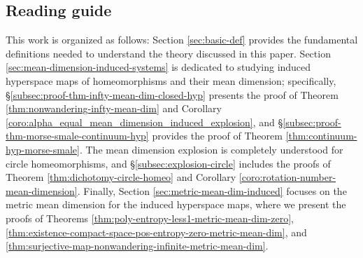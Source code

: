 \documentclass[sn-mathphys-num]{sn-jnl}%
\theoremstyle{thmstyleone}%
\newtheorem{corollary}{Corollary}
\newtheorem*{question*}{Question}
\theoremstyle{thmstyletwo}%
\theoremstyle{thmstylethree}%
\newcommand*\induce[1]{#1_\mathcal{K}}
\newcommand*\hyp[1]{\mathcal{#1}}
\begin{document}





\subsection{Reading guide}

This work is organized as follows: Section \ref{sec:basic-def} provides the fundamental definitions needed to understand the theory discussed in this paper. Section \ref{sec:mean-dimension-induced-systems} is dedicated to studying induced hyperspace maps of homeomorphisms and their mean dimension; specifically, \S\ref{subsec:proof-thm-infty-mean-dim-closed-hyp} presents the proof of Theorem \ref{thm:nonwandering-infty-mean-dim} and Corollary \ref{coro:alpha_equal_mean_dimension_induced_explosion}, and \S\ref{subsec:proof-thm-morse-smale-continuum-hyp} provides the proof of Theorem \ref{thm:continuum-hyp-morse-smale}. The mean dimension explosion is completely understood for circle homeomorphisms, and \S\ref{subsec:explosion-circle} includes the proofs of Theorem \ref{thm:dichotomy-circle-homeo} and Corollary \ref{coro:rotation-number-mean-dimension}. Finally, Section \ref{sec:metric-mean-dim-induced} focuses on the metric mean dimension for the induced hyperspace maps, where we present the proofs of Theorems \ref{thm:poly-entropy-less1-metric-mean-dim-zero}, \ref{thm:existence-compact-space-pos-entropy-zero-metric-mean-dim}, and \ref{thm:surjective-map-nonwandering-infinite-metric-mean-dim}.
\end{document}

